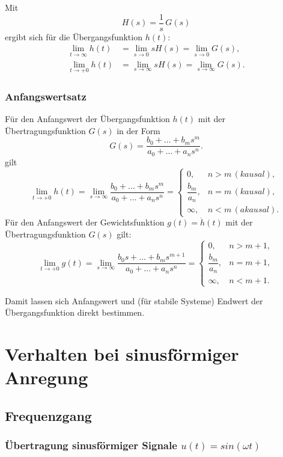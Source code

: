 \documentclass[12pt]{article}
\begin{document}
Mit
\[
H(s) = \frac{1}{s}\,G(s)
\]
ergibt sich für die Übergangsfunktion \(h(t)\):
\begin{align}
	\lim_{t\to\infty} h(t) &= \lim_{s\to0} sH(s) = \lim_{s\to0} G(s), \\
	\lim_{t\to+0} h(t) &= \lim_{s\to\infty} sH(s) = \lim_{s\to\infty} G(s).
\end{align}

\subsubsection{Anfangswertsatz}



Für den Anfangswert der Übergangsfunktion \(h(t)\) mit der Übertragungsfunktion  \(G(s)\) in der Form
\[
G(s)=\frac{b_0 + \dots + b_m s^m}{a_0 + \dots + a_n s^n}.
\]
gilt
\begin{equation}
\lim_{t\to+0} h(t)=\lim_{s\to\infty}
\frac{b_0 + \dots + b_m s^m}{a_0 + \dots + a_n s^n}=
\begin{cases}
0, & n>m \,(kausal),\\
\dfrac{b_m}{a_n}, & n=m \,(kausal),\\
\infty, & n<m \,(akausal).
\end{cases}
\end{equation}
\noindent
Für den Anfangswert der Gewichtsfunktion \(g(t) = \dot{h}(t)\) mit der Übertragungsfunktion  \(G(s)\) gilt:
\begin{equation}
\lim_{t\to+0} g(t)=\lim_{s\to\infty}
\frac{b_0 s + \dots + b_m s^{m+1}}{a_0 + \dots + a_n s^n}=
\begin{cases}
0, & n>m+1,\\
\dfrac{b_m}{a_n}, & n=m+1,\\
\infty, & n<m+1.
\end{cases}
\end{equation}

Damit lassen sich Anfangswert und (für stabile Systeme) Endwert der
Übergangsfunktion direkt bestimmen.

\FloatBarrier
\clearpage
\section{Verhalten bei sinusförmiger Anregung}
\subsection{Frequenzgang}
\subsubsection{Übertragung sinusförmiger Signale \(u(t) = sin(\omega t)\)}
\end{document}
